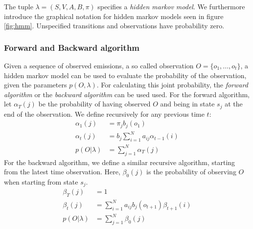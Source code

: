 The tuple $\lambda = (S, V, A, B, \pi)$ specifies a \textit{hidden markov model}. We furthermore introduce the graphical notation for hidden markov models seen in figure \ref{fig:hmm}. Unspecified transitions and observations have probability zero. 

\begin{minipage}{\linewidth}
	\label{fig:hmm}
	\hspace{1cm}
\end{minipage}

\subsubsection{Forward and Backward algorithm}
Given a sequence of observed emissions, a so called observation $O = \{o_1, \dots, o_t\}$, a hidden markov model can be used to evaluate the probability of the observation, given the parameters $p(O, \lambda)$. For calculating this joint probability, the \textit{forward algorithm} or the \textit{backward algorithm} can be used used. For the forward algorithm, let $\alpha_T(j)$ be the probability of having observed $O$ and being in state $s_j$ at the end of the observation. We define recursively for any previous time $t$:
\begin{align*}
\alpha_1(j) &= \pi_j b_j(o_1) \\
\alpha_t(j) &= b_j \sum_{i = 1}^{N} a_{ij}\alpha_{t-1}(i) \\
p(O|\lambda) &= \sum_{j = 1}^{N} \alpha_T(j)
\end{align*}
For the backward algorithm, we define a similar recursive algorithm, starting from the latest time observation. Here, $\beta_0(j)$ is the probability of observing $O$ when starting from state $s_j$.
\begin{align*}
\beta_T(j) &= 1 \\
\beta_t(j) &= \sum_{i = 1}^{N} a_{ij}b_j(o_{t+1}) \beta_{t+1}(i) \\
p(O|\lambda) &= \sum_{j = 1}^{N} \beta_0(j)
\end{align*}
